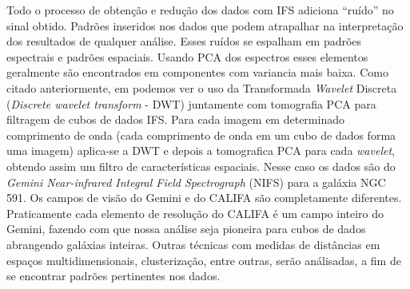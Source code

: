 \documentclass[a4paper,12pt]{article}
\begin{document}
Todo o processo de obtenção e redução dos dados com IFS adiciona ``ruído'' no sinal obtido. Padrões inseridos nos dados que podem atrapalhar na
interpretação dos resultados de qualquer análise. Esses ruídos se espalham em padrões espectrais e padrões espaciais. Usando PCA dos espectros esses
elementos geralmente são encontrados em componentes com variancia mais baixa. Como citado anteriormente, em \citet{Riffel2011} podemos ver o uso da
Transformada {\em Wavelet} Discreta ({\em Discrete wavelet transform} - DWT) juntamente com tomografia PCA para filtragem de cubos de dados IFS.
Para cada imagem em determinado comprimento de onda (cada comprimento de onda em um cubo de dados forma uma imagem) aplica-se a DWT e depois a
tomografica PCA para cada {\em wavelet}, obtendo assim um filtro de características espaciais. Nesse caso os dados são do {\em Gemini Near-infrared
Integral Field Spectrograph} (NIFS) para a galáxia NGC 591. Os campos de visão do Gemini e do CALIFA são completamente diferentes. Praticamente cada
elemento de resolução do CALIFA é um campo inteiro do Gemini, fazendo com que nossa análise seja pioneira para cubos de dados abrangendo galáxias
inteiras. Outras técnicas com medidas de distâncias em espaços multidimensionais, clusterização, entre outras, serão análisadas, a fim de se encontrar
padrões pertinentes nos dados.



    
\end{document}
